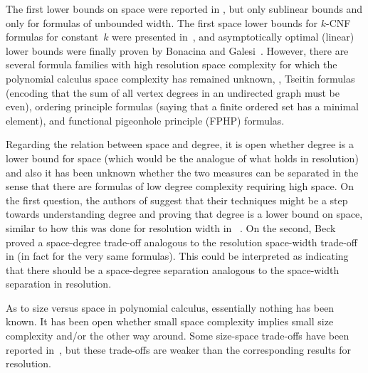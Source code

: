 The first lower bounds on space were reported in
\cite{ABRW02SpaceComplexity},
but only sublinear bounds and only for
formulas of unbounded width. The first space lower bounds for
\mbox{$k$-CNF} formulas
%
%
for constant~$k$ were presented in~\cite{FLNRT15SpaceCplx},
and asymptotically optimal (linear) lower bounds
were finally proven by
Bonacina and Galesi~\cite{BG15Framework}.
However, there are several formula families with high resolution space complexity
for which the 
%
polynomial calculus   
space complexity has remained unknown,
%
\eg,     %
Tseitin formulas (encoding
%
that the sum of all vertex
degrees in an undirected graph must be even), 
ordering principle formulas
%
(saying that a finite ordered set has a minimal element),
and 
%
functional pigeonhole principle (FPHP) formulas.

Regarding the relation between space and degree, it is open whether
degree is a lower bound for space 
(which would be the analogue of what holds in resolution)
and also it has been unknown whether the two
measures can be separated in the sense that there are formulas of low
degree complexity requiring high space.
%
On the first question, the authors of \cite{BG15Framework} suggest
that their techniques might be a step towards understanding degree and
proving that degree %
is a lower bound on  %
space, similar to how this was done
for resolution width in~%
\cite{AD08CombinatoricalCharacterization}.
%
On the second, Beck \etal~\cite{BNT13SomeTradeoffs} proved a
space-degree trade-off analogous to the resolution space-width
trade-off in \cite{Ben-Sasson09SizeSpaceTradeoffs} (in fact for the
very same formulas).  This
%
could be interpreted as indicating that there should be a space-degree
separation analogous to the space-width separation in resolution.


As to size versus space in 
%
polynomial calculus,   
essentially nothing has been known.
It 
%
has been 
open whether small space complexity implies small size
complexity and/or the other way around.
Some size-space trade-offs 
%
%
have been
reported in~\cite{BNT13SomeTradeoffs,HN12VirtueSuccinctProofs},
but these trade-offs are weaker than the corresponding results for
resolution. 

\label{sec:intro-our-results}

